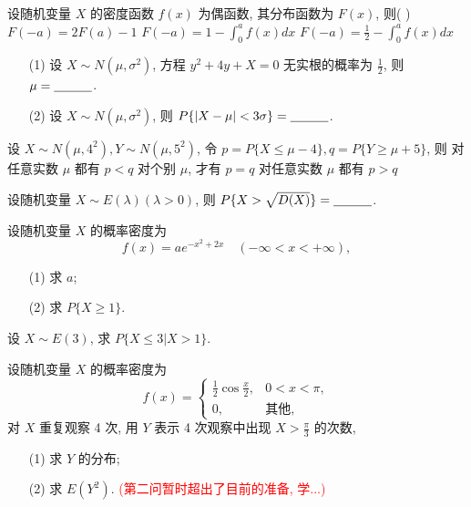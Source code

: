 \documentclass[padp]{ExBook}
\begin{document}
\begin{qitems}
\begin{bbox}
        \qitem  设随机变量 $X$ 的密度函数 $f(x)$ 为偶函数, 其分布函数为 $F(x)$, 则( \quad )
        {$F(-a) = 2F(a)-1$}
        { $F(-a) = 1 - \int_0^a f(x)dx$}
        {$F(-a) = \frac{1}{2} - \int_0^a f(x)dx$}
    \end{bbox}
    \begin{bbox}
        \qitem  \begin{enumerate}
    \item[(1)] 设 $X \sim N(\mu, \sigma^2)$, 方程 $y^2+4y+X=0$ 无实根的概率为 $\frac{1}{2}$, 则 $\mu = \underline{\hspace{3em}}$.
    \item[(2)] 设 $X \sim N(\mu, \sigma^2)$, 则 $P\{|X-\mu| < 3\sigma\} = \underline{\hspace{3em}}$.
\end{enumerate}
    \end{bbox}
    \begin{bbox}
        \qitem  设 $X \sim N(\mu, 4^2), Y \sim N(\mu, 5^2)$, 令 $p = P\{X \le \mu-4\}, q = P\{Y \ge \mu+5\}$, 则
        {对任意实数 $\mu$ 都有 $p<q$}
        {对个别 $\mu$, 才有 $p=q$}
        {对任意实数 $\mu$ 都有 $p>q$}
    \end{bbox}
     \begin{bbox}
        \qitem  设随机变量 $X \sim E(\lambda) (\lambda > 0)$, 则 $P\{X > \sqrt{D(X)}\} = \underline{\hspace{3em}}$.
    \end{bbox}
    \begin{bbox}
        \qitem  设随机变量 $X$ 的概率密度为
$$ f(x) = ae^{-x^2+2x} \quad (-\infty < x < +\infty), $$
\begin{enumerate}
    \item[(1)] 求 $a$;
    \item[(2)] 求 $P\{X \ge 1\}$.
\end{enumerate}
    \end{bbox}
     \begin{bbox}
        \qitem  设 $X \sim E(3)$, 求 $P\{X \le 3 | X > 1\}$.
    \end{bbox}
    \begin{bbox}
        \qitem  设随机变量 $X$ 的概率密度为
$$ f(x) = \begin{cases} \frac{1}{2}\cos\frac{x}{2}, & 0 < x < \pi, \\ 0, & \text{其他}, \end{cases} $$
对 $X$ 重复观察 4 次, 用 $Y$ 表示 4 次观察中出现 $X > \frac{\pi}{3}$ 的次数,
\begin{enumerate}
    \item[(1)] 求 $Y$ 的分布;
    \item[(2)] 求 $E(Y^2)$. \textcolor{red}{(第二问暂时超出了目前的准备, 学...)}

\end{enumerate}
\end{bbox}
\end{qitems}
\end{document}
